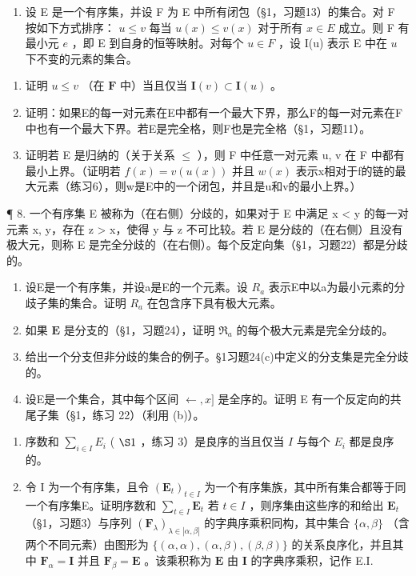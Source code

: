 \begin{enumerate}
\def\labelenumi{\arabic{enumi}.}
\setcounter{enumi}{6}
\tightlist
\item
  设 E 是一个有序集，并设 F 为 E 中所有闭包（§1，习题13）的集合。对 F 按如下方式排序： \(u \leqslant v\) 每当 \(u(x) \leqslant v(x)\) 对于所有 \(x \in E\) 成立。则 F 有最小元 \(e\) ，即 E 到自身的恒等映射。对每个 \(u \in F\) ，设 I(u) 表示 E 中在 \(u\) 下不变的元素的集合。
\end{enumerate}

\begin{enumerate}
\def\labelenumi{(\alph{enumi})}
\item
  证明 \(u \leqslant v\) （在 \(\mathbf{F}\) 中）当且仅当 \(\mathbf{I}(v) \subset \mathbf{I}(u)\) 。
\item
  证明：如果E的每一对元素在E中都有一个最大下界，那么F的每一对元素在F中也有一个最大下界。若E是完全格，则F也是完全格（§1，习题11）。
\item
  证明若 E 是归纳的（关于关系 \(\leqslant\) ），则 F 中任意一对元素 u, v 在 F 中都有最小上界。（证明若 \(f(x) = v(u(x))\) 并且 \(w(x)\) 表示x相对于f的链的最大元素（练习6），则w是E中的一个闭包，并且是u和v的最小上界。）
\end{enumerate}

¶ 8. 一个有序集 E 被称为（在右侧）分歧的，如果对于 E 中满足 x \textless{} y 的每一对元素 x, y，存在 z \textgreater{} x，使得 y 与 z 不可比较。若 E 是分歧的（在右侧）且没有极大元，则称 E 是完全分歧的（在右侧）。每个反定向集（§1，习题22）都是分歧的。

\begin{enumerate}
\def\labelenumi{(\alph{enumi})}
\item
  设E是一个有序集，并设a是E的一个元素。设 \(R_{a}\) 表示E中以a为最小元素的分歧子集的集合。证明 \(R_{a}\) 在包含序下具有极大元素。
\item
  如果 \(\mathbf{E}\) 是分支的（§1，习题24），证明 \(\mathfrak{R}_a\) 的每个极大元素是完全分歧的。
\item
  给出一个分支但非分歧的集合的例子。§1习题24(c)中定义的分支集是完全分歧的。
\item
  设E是一个集合，其中每个区间 \(\leftarrow, x]\) 是全序的。证明 E 有一个反定向的共尾子集（§1，练习 22）（利用 (b)）。
\end{enumerate}

\begin{enumerate}
\def\labelenumi{\arabic{enumi}.}
\setcounter{enumi}{8}
\item
  序数和 \(\sum_{i\in I}E_i\) ( \(\S 1\) ，练习 3）是良序的当且仅当 \(I\) 与每个 \(E_i\) 都是良序的。
\item
  令 I 为一个有序集，且令 \((\mathbf{E}_t)_{t \in I}\) 为一个有序集族，其中所有集合都等于同一个有序集E。证明序数和 \(\sum_{t \in I} \mathbf{E}_t\) 若 \(t \in I\) ，则序集由这些序的和给出 \(\mathbf{E}_t\) （§1，习题3）与序列 \((\mathbf{F}_{\lambda})_{\lambda \in |\alpha, \beta|}\) 的字典序乘积同构，其中集合 \(\{\alpha, \beta\}\) （含两个不同元素）由图形为 \(\{(\alpha, \alpha), (\alpha, \beta), (\beta, \beta)\}\) 的关系良序化，并且其中 \(\mathbf{F}_{\alpha} = \mathbf{I}\) 并且 \(\mathbf{F}_{\beta} = \mathbf{E}\) 。该乘积称为 \(\mathbf{E}\) 由 \(\mathbf{I}\) 的字典序乘积，记作 E.I.
\end{enumerate}

